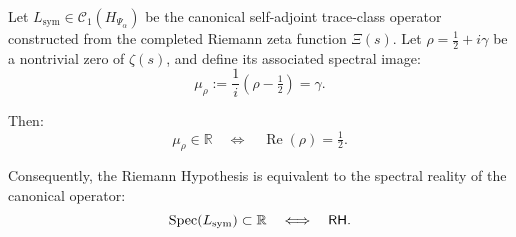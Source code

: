\begin{lemma}
\label{lem_reality_of_spectrum_and_rh}

Let \( L_{\mathrm{sym}} \in \mathcal{C}_1(H_{\Psi_\alpha}) \) be the canonical self-adjoint trace-class operator constructed from the completed Riemann zeta function \( \Xi(s) \). Let \( \rho = \tfrac{1}{2} + i\gamma \) be a nontrivial zero of \( \zeta(s) \), and define its associated spectral image:
\[
\mu_\rho := \frac{1}{i}(\rho - \tfrac{1}{2}) = \gamma.
\]

Then:
\[
\mu_\rho \in \mathbb{R} \quad \Longleftrightarrow \quad \operatorname{Re}(\rho) = \tfrac{1}{2}.
\]

\medskip

\noindent
Consequently, the Riemann Hypothesis is equivalent to the spectral reality of the canonical operator:
\[
\operatorname{Spec}(L_{\mathrm{sym}}) \subset \mathbb{R} \quad \Longleftrightarrow \quad \mathsf{RH}.
\]
\end{lemma}
